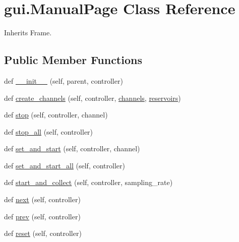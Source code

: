 \hypertarget{classgui_1_1_manual_page}{}\section{gui.\+Manual\+Page Class Reference}
\label{classgui_1_1_manual_page}


Inherits Frame.

\subsection*{Public Member Functions}
\begin{DoxyCompactItemize}
\item 
def \mbox{\hyperlink{classgui_1_1_manual_page_a43831878b65f967b5e9189cc8ea6b23a}{\+\_\+\+\_\+init\+\_\+\+\_\+}} (self, parent, controller)
\item 
def \mbox{\hyperlink{classgui_1_1_manual_page_acc5098f07ab29863867f98a11d314451}{create\+\_\+channels}} (self, controller, \mbox{\hyperlink{classgui_1_1_manual_page_aab87bc8a54f5de4fc44615a948fa233d}{channels}}, \mbox{\hyperlink{classgui_1_1_manual_page_a43d4459abfcb563c8d9e66fadd6923da}{reservoirs}})
\item 
def \mbox{\hyperlink{classgui_1_1_manual_page_adeef13a7e7f9dda02723d1c144672a2a}{stop}} (self, controller, channel)
\item 
def \mbox{\hyperlink{classgui_1_1_manual_page_ae6be1512597bfca55c01e830623aed6e}{stop\+\_\+all}} (self, controller)
\item 
def \mbox{\hyperlink{classgui_1_1_manual_page_abee62c1ff09ba1b65405cebc5da5e013}{set\+\_\+and\+\_\+start}} (self, controller, channel)
\item 
def \mbox{\hyperlink{classgui_1_1_manual_page_aafb53b0cbb634487b3b8c92f86e2ec84}{set\+\_\+and\+\_\+start\+\_\+all}} (self, controller)
\item 
def \mbox{\hyperlink{classgui_1_1_manual_page_a84aad97721801aac938836ad9df5ac11}{start\+\_\+and\+\_\+collect}} (self, controller, sampling\+\_\+rate)
\item 
def \mbox{\hyperlink{classgui_1_1_manual_page_a28ccffcefb06e61579ed0f583719a5cb}{next}} (self, controller)
\item 
def \mbox{\hyperlink{classgui_1_1_manual_page_a57e9ed5a1ee1d6e3bcecc7715d266e51}{prev}} (self, controller)
\item 
def \mbox{\hyperlink{classgui_1_1_manual_page_afd759af883bbbc147da7af8193f680fb}{reset}} (self, controller)
\item 

\end{DoxyCompactItemize}
